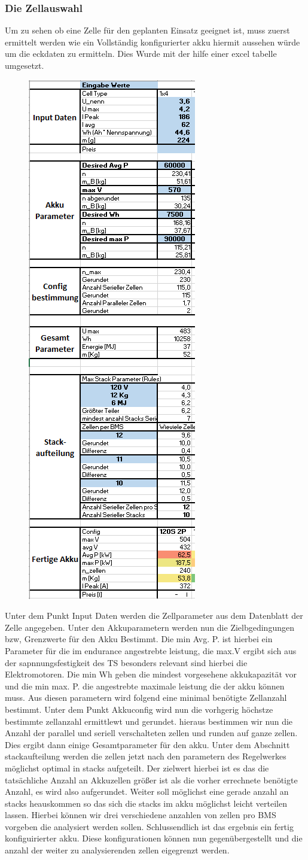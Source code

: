 \subsubsection{Die Zellauswahl}
Um zu sehen ob eine Zelle für den geplanten Einsatz geeignet ist, muss zuerst ermittelt werden wie ein Vollständig konfigurierter akku hiermit aussehen würde um die eckdaten zu ermitteln. Dies Wurde mit der hilfe einer excel tabelle umgesetzt. 
\begin{figure}[h]
	\centering
	\includegraphics[width=0.2\linewidth]{bilder/Ausschnitt_zellvergleich}
	\caption{}
	\label{fig:Ausschnitt_zellvergleich}
\end{figure}
\FloatBarrier
Unter dem Punkt Input Daten werden die Zellparameter aus dem Datenblatt der Zelle angegeben. Unter den Akkuparametern werden nun die Zielbgedingungen bzw, Grenzwerte für den Akku Bestimmt. Die min Avg. P. ist hierbei ein Parameter für die im endurance angestrebte leistung, die max.V ergibt sich aus der sapnnungsfestigkeit des TS besonders relevant sind hierbei die Elektromotoren. Die min Wh geben die mindest vorgesehene akkukapazität vor und die min max. P. die angestrebte maximale leistung die der akku können muss. Aus diesen parametern wird folgend eine minimal benötigte Zellanzahl bestimmt. Unter dem Punkt Akkuconfig wird nun die vorhgerig höchstze bestimmte zellanzahl ermittlewt und gerundet. hieraus bestimmen wir nun die Anzahl der parallel und seriell verschalteten zellen und runden auf ganze zellen.
Dies ergibt dann einige Gesamtparameter für den akku.
Unter dem Abschnitt stackaufteilung werden die zellen jetzt nach den parametern des Regelwerkes möglichst optimal in stacks aufgeteilt. Der zielwert hierbei ist es das die tatsächliche Anzahl an Akkuzellen größer ist als die vorher errechnete benötigte Anzahl, es wird also aufgerundet. Weiter soll möglichst eine gerade anzahl an stacks heauskommen so das sich die stacks im akku möglichst leicht verteilen lassen. Hierbei können wir drei verschiedene anzahlen von zellen pro BMS vorgeben die analysiert werden sollen.
Schlussendlich ist das ergebnis ein fertig konfiguirierter akku. Diese konfigurationen können nun gegenübergestellt und die anzahl der weiter zu analysierenden zellen eigegrenzt werden.

